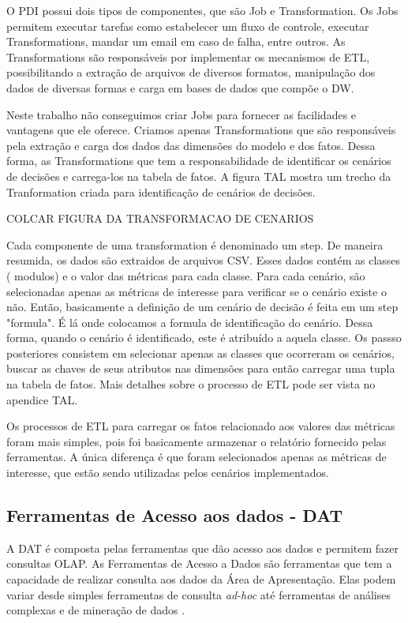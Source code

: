 O PDI possui dois tipos de componentes, que são Job e Transformation. Os Jobs permitem executar tarefas como estabelecer um fluxo de controle, executar Transformations, mandar um email em caso de falha, entre outros. As Transformations são responsáveis por implementar os mecanismos de ETL, possibilitando a extração de arquivos de diversos formatos, manipulação dos dados de diversas formas e carga em bases de dados que compõe o DW.


Neste trabalho não conseguimos criar Jobs para fornecer as facilidades e vantagens que ele oferece. Criamos apenas Transformations que são responsáveis pela extração e carga dos dados das dimensões do modelo e dos fatos. Dessa forma, as Transformations que tem a responsabilidade de identificar os cenários de decisões e carrega-los na tabela de fatos. A figura TAL mostra um trecho da Tranformation criada para identificação de cenários de decisões.


COLCAR FIGURA DA TRANSFORMACAO DE CENARIOS


Cada componente de uma transformation é denominado um step. De maneira resumida, os dados são extraidos de arquivos CSV. Esses dados contém as classes ( modulos) e o valor das métricas para cada classe. Para cada cenário, são selecionadas apenas as métricas de interesse para verificar se o cenário existe o não. Então, basicamente a definição de um cenário de decisão é feita em um step "formula". É lá onde colocamos a formula de identificação do cenário. Dessa forma, quando o cenário é identificado, este é atribuído a aquela classe. Os passso posteriores consistem em selecionar apenas as classes que ocorreram os cenários, buscar as chaves de seus atributos nas dimensões para então carregar uma tupla na tabela de fatos. Mais detalhes sobre o processo de ETL pode ser vista no apendice TAL.


Os processos de ETL para carregar os fatos relacionado aos valores das métricas foram mais simples, pois foi basicamente armazenar o relatório fornecido pelas ferramentas. A única diferença é que foram selecionados apenas as métricas de interesse, que estão sendo utilizadas pelos cenários implementados.

\subsection{Ferramentas de Acesso aos dados - DAT}

A DAT é composta pelas ferramentas que dão acesso aos dados e permitem fazer consultas OLAP. As Ferramentas de Acesso a Dados são ferramentas que tem a capacidade de realizar consulta aos dados da Área de Apresentação. Elas podem variar desde simples ferramentas de consulta \emph{ad-hoc} até ferramentas de análises complexas e de mineração de dados \cite{kimball2002}.


